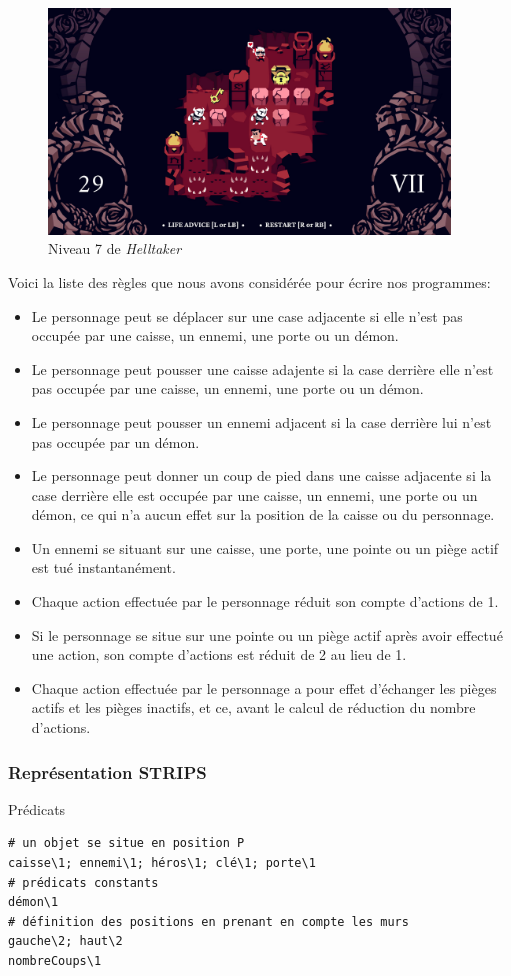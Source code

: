 \begin{figure}[H]
	\centering
	\includegraphics[height=6cm]{figures/level7.jpg}
	\caption{Niveau 7 de \textit{Helltaker}}
\end{figure}

Voici la liste des règles que nous avons considérée pour écrire nos programmes:
\begin{itemize}
	\item Le personnage peut se déplacer sur une case adjacente si elle n'est pas occupée par une caisse, un ennemi, une porte ou un démon.
	\item Le personnage peut pousser une caisse adajente si la case derrière elle n'est pas occupée par une caisse, un ennemi, une porte ou un démon.
	\item Le personnage peut pousser un ennemi adjacent si la case derrière lui n'est pas occupée par un démon.
	\item Le personnage peut donner un coup de pied dans une caisse adjacente si la case derrière elle est occupée par une caisse, un ennemi, une porte ou un démon, ce qui n'a aucun effet sur la position de la caisse ou du personnage.
	\item Un ennemi se situant sur une caisse, une porte, une pointe ou un piège actif est tué instantanément.
	\item Chaque action effectuée par le personnage réduit son compte d'actions de 1.
	\item Si le personnage se situe sur une pointe ou un piège actif après avoir effectué une action, son compte d'actions est réduit de 2 au lieu de 1.
	\item Chaque action effectuée par le personnage a pour effet d'échanger les pièges actifs et les pièges inactifs, et ce, avant le calcul de réduction du nombre d'actions.
\end{itemize}
\clearpage
\subsubsection{Représentation STRIPS}
Prédicats
\begin{lstlisting}
# un objet se situe en position P
caisse\1; ennemi\1; héros\1; clé\1; porte\1
# prédicats constants
démon\1
# définition des positions en prenant en compte les murs
gauche\2; haut\2
nombreCoups\1

\end{lstlisting}

